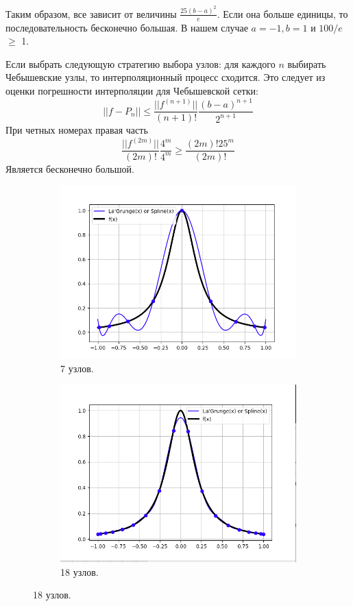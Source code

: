 \documentclass[12pt,a4paper]{article}
\begin{document}
Таким образом, все зависит от величины $\frac{25(b-a)^2} {e}$. Если она больше единицы, то последовательность бесконечно большая. В нашем случае $a = -1, b = 1$ и $100 / e$ $\geq$ 1.

Если выбрать следующую стратегию выбора узлов: для каждого $n$ выбирать Чебышевские узлы, то интерполяционный процесс сходится. Это следует из оценки погрешности интерполяции для Чебышевской сетки:
\begin{equation}
	||f - P_n|| \leq \frac{||f^ {(n+1)}||}{(n + 1)!} \frac{(b-a)^{n+1}}{2^{n+1}}
\end{equation}
При четных номерах правая часть
\begin{equation}
	\frac{||f^ {(2m)}||}{(2m)!} \frac{4^m}{4^m} \geq \frac{(2m)! 25^m}{(2m)!}
\end{equation}
Является бесконечно большой.
	\begin{figure}[h!]
	\centering
	\begin{subfigure}[b]{0.4\linewidth}
		\includegraphics[width=\linewidth]{runge_cheb_9}
		\caption{7 узлов.}
	\end{subfigure}
	\begin{subfigure}[b]{0.4\linewidth}
		\includegraphics[width=\linewidth]{runge_cheb_18}
		\caption{18 узлов.}
	\end{subfigure}
\end{figure}
\end{document}
